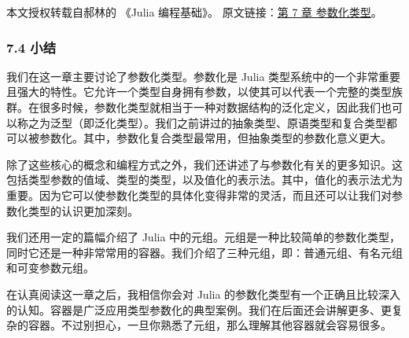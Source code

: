 
本文授权转载自郝林的 《Julia 编程基础》。 原文链接：\href{https://github.com/hyper0x/JuliaBasics/blob/master/book/ch07.md}{第 7 章 参数化类型}。


\subsubsection{7.4 小结}

我们在这一章主要讨论了参数化类型。参数化是 Julia 类型系统中的一个非常重要且强大的特性。它允许一个类型自身拥有参数，以使其可以代表一个完整的类型族群。在很多时候，参数化类型就相当于一种对数据结构的泛化定义，因此我们也可以称之为泛型（即泛化类型）。我们之前讲过的抽象类型、原语类型和复合类型都可以被参数化。其中，参数化复合类型最常用，但抽象类型的参数化意义更大。

除了这些核心的概念和编程方式之外，我们还讲述了与参数化有关的更多知识。这包括类型参数的值域、类型的类型，以及值化的表示法。其中，值化的表示法尤为重要。因为它可以使参数化类型的具体化变得非常的灵活，而且还可以让我们对参数化类型的认识更加深刻。

我们还用一定的篇幅介绍了 Julia 中的元组。元组是一种比较简单的参数化类型，同时它还是一种非常常用的容器。我们介绍了三种元组，即：普通元组、有名元组和可变参数元组。

在认真阅读这一章之后，我相信你会对 Julia 的参数化类型有一个正确且比较深入的认知。容器是广泛应用类型参数化的典型案例。我们在后面还会讲解更多、更复杂的容器。不过别担心，一旦你熟悉了元组，那么理解其他容器就会容易很多。